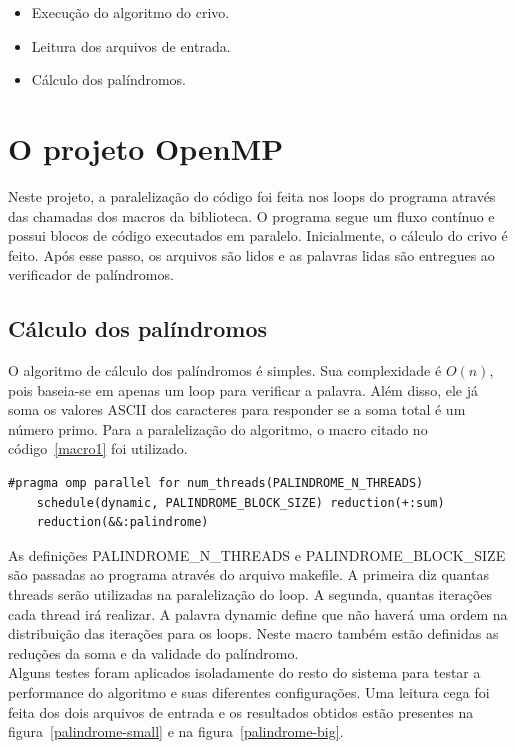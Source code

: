 \documentclass[a4paper]{article}
\begin{document}
\begin{itemize}
	\item Execução do algoritmo do crivo.
	\item Leitura dos arquivos de entrada.
	\item Cálculo dos palíndromos.
\end{itemize}

\section{O projeto OpenMP}
\indent \indent Neste projeto, a paralelização do código foi feita nos loops do programa através das chamadas dos macros da biblioteca. O programa segue um fluxo contínuo e possui blocos de código executados em paralelo. Inicialmente, o cálculo do crivo é feito. Após esse passo, os arquivos são lidos e as palavras lidas são entregues ao verificador de palíndromos.

\subsection{Cálculo dos palíndromos}
\indent \indent O algoritmo de cálculo dos palíndromos é simples. Sua complexidade é \begin{math}O(n)\end{math}, pois baseia-se em apenas um loop para verificar a palavra. Além disso, ele já soma os valores ASCII dos caracteres para responder se a soma total é um número primo. Para a paralelização do algoritmo, o macro citado no código~\ref{macro1} foi utilizado.

\begin{lstlisting}[caption=Macro que paraleliza o algoritmo do palíndromo, float=h, label=macro1]
#pragma omp parallel for num_threads(PALINDROME_N_THREADS) 
	schedule(dynamic, PALINDROME_BLOCK_SIZE) reduction(+:sum) 
	reduction(&&:palindrome)
\end{lstlisting}

As definições PALINDROME\_N\_THREADS e PALINDROME\_BLOCK\_SIZE são passadas ao programa através do arquivo makefile. A primeira diz quantas threads serão utilizadas na paralelização do loop. A segunda, quantas iterações cada thread irá realizar. A palavra dynamic define que não haverá uma ordem na distribuição das iterações para os loops. Neste macro também estão definidas as reduções da soma e da validade do palíndromo.\\
\indent Alguns testes foram aplicados isoladamente do resto do sistema para testar a performance do algoritmo e suas diferentes configurações. Uma leitura cega foi feita dos dois arquivos de entrada e os resultados obtidos estão presentes na figura~\ref{palindrome-small} e na figura~\ref{palindrome-big}.
\end{document}
